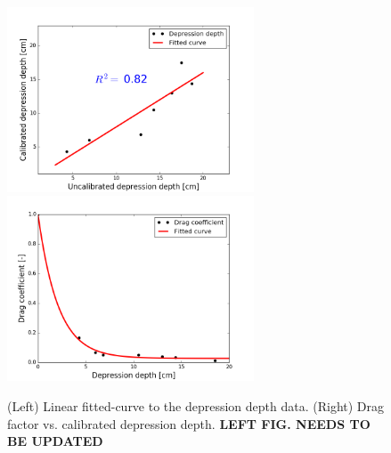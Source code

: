 \documentclass[review,11pt]{elsarticle}
\begin{document}
\begin{figure}[!h]
\centering
\includegraphics[width=6.cm, height=5.5cm]{./figures/fittedcurve-dd-1.png}
\includegraphics[width=6.cm, height=5.5cm]{./figures/fittedcurve-manning.png}
\caption{ (Left) Linear fitted-curve to the depression depth data. (Right) Drag factor vs. calibrated depression depth. \textbf{LEFT FIG. NEEDS TO BE UPDATED}}
\label{curvefit-dd-manning}
\end{figure}
\end{document}
